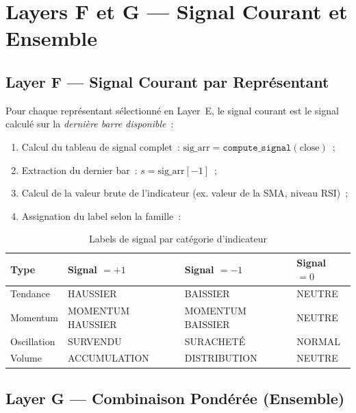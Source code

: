 \section{Layers F et G --- Signal Courant et Ensemble}
\label{sec:layers_fg}

\subsection{Layer F — Signal Courant par Représentant}

Pour chaque représentant sélectionné en Layer~E, le signal courant est le signal
calculé sur la \emph{dernière barre disponible}~:

\begin{enumerate}
    \item Calcul du tableau de signal complet~: $\text{sig\_arr} = \texttt{compute\_signal}(\text{close})$~;
    \item Extraction du dernier bar~: $s = \text{sig\_arr}[-1]$~;
    \item Calcul de la valeur brute de l'indicateur (ex. valeur de la SMA, niveau RSI)~;
    \item Assignation du label selon la famille~:
\end{enumerate}

\begin{table}[H]
\centering
\caption{Labels de signal par catégorie d'indicateur}
\label{tab:labels_signal}
\begin{tabularx}{\linewidth}{@{}lYYY@{}}
\toprule
\textbf{Type} & \textbf{Signal $= +1$} & \textbf{Signal $= -1$} & \textbf{Signal $= 0$} \\
\midrule
Tendance    & HAUSSIER          & BAISSIER          & NEUTRE  \\
Momentum    & MOMENTUM HAUSSIER & MOMENTUM BAISSIER & NEUTRE  \\
Oscillation & SURVENDU          & SURACHETÉ         & NORMAL  \\
Volume      & ACCUMULATION      & DISTRIBUTION      & NEUTRE  \\
\bottomrule
\end{tabularx}
\end{table}

\subsection{Layer G — Combinaison Pondérée (Ensemble)}

